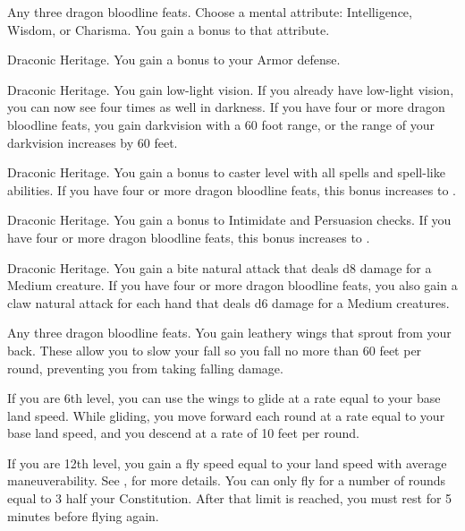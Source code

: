 \featpre Any three dragon bloodline feats.
\featben Choose a mental attribute: Intelligence, Wisdom, or Charisma. You gain a  bonus to that attribute.

 Draconic Heritage.
 You gain a  bonus to your Armor defense.

 Draconic Heritage.
 You gain low-light vision. If you already have low-light vision, you can now see four times as well in darkness. If you have four or more dragon bloodline feats, you gain darkvision with a 60 foot range, or the range of your darkvision increases by 60 feet.

 Draconic Heritage.
 You gain a  bonus to caster level with all spells and spell-like abilities. If you have four or more dragon bloodline feats, this bonus increases to .

 Draconic Heritage.
 You gain a  bonus to Intimidate and Persuasion checks. If you have four or more dragon bloodline feats, this bonus increases to .

 Draconic Heritage.
 You gain a bite natural attack that deals d8 damage for a Medium creature. If you have four or more dragon bloodline feats, you also gain a claw natural attack for each hand that deals d6 damage for a Medium creatures.

 Any three dragon bloodline feats.
 You gain leathery wings that sprout from your back. These allow you to slow your fall so you fall no more than 60 feet per round, preventing you from taking falling damage.

If you are 6th level, you can use the wings to glide at a rate equal to your base land speed. While gliding, you move forward each round at a rate equal to your base land speed, and you descend at a rate of 10 feet per round.

If you are 12th level, you gain a fly speed equal to your land speed with average maneuverability. See , for more details. You can only fly for a number of rounds equal to 3 \add half your Constitution. After that limit is reached, you must rest for 5 minutes before flying again.

